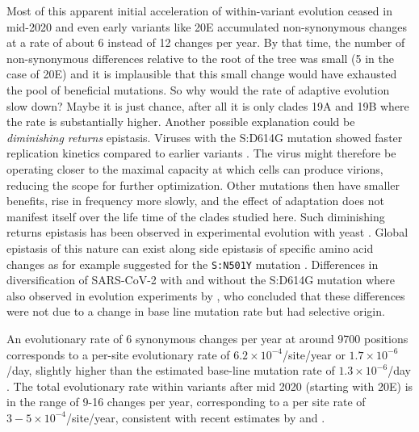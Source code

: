 \documentclass[aps,rmp, twocolumn]{revtex4}
\begin{document}
Most of this apparent initial acceleration of within-variant evolution ceased in mid-2020 and even early variants like 20E accumulated non-synonymous changes at a rate of about 6 instead of 12 changes per year.
By that time, the number of non-synonymous differences relative to the root of the tree was small (5 in the case of 20E) and it is implausible that this small change would have exhausted the pool of beneficial mutations.
So why would the rate of adaptive evolution slow down?
Maybe it is just chance, after all it is only clades 19A and 19B where the rate is substantially higher.
Another possible explanation could be \emph{diminishing returns} epistasis.
Viruses with the S:D614G mutation showed faster replication kinetics compared to earlier variants \citep{korber_tracking_2020}.
The virus might therefore be operating closer to the maximal capacity at which cells can produce virions, reducing the scope for further optimization.
Other mutations then have smaller benefits, rise in frequency more slowly, and the effect of adaptation does not manifest itself over the life time of the clades studied here.
Such diminishing returns epistasis has been observed in experimental evolution with yeast \citep{kryazhimskiy_global_2014}.
Global epistasis of this nature can exist along side epistasis of specific amino acid changes as for example suggested for the \texttt{S:N501Y} mutation \citep{martin_emergence_2021}.
Differences in diversification of SARS-CoV-2 with and without the S:D614G mutation where also observed in evolution experiments by \citet{amicone_mutation_2022}, who concluded that these differences were not due to a change in base line mutation rate but had selective origin.

An evolutionary rate of 6 synonymous changes per year at around 9700 positions corresponds to a per-site evolutionary rate of $6.2\times 10^{-4}$/site/year or $1.7\times 10^{-6}$/day, slightly higher than the estimated base-line mutation rate of $1.3\times 10^{-6}$/day \citep{amicone_mutation_2022}.
The total evolutionary rate within variants after mid 2020 (starting with 20E) is in the range of 9-16 changes per year, corresponding to a per site rate of $3 - 5\times 10^{-4}$/site/year, consistent with recent estimates by \citet{hill_origins_2022} and \citet{tay_emergence_2022}.
\end{document}
